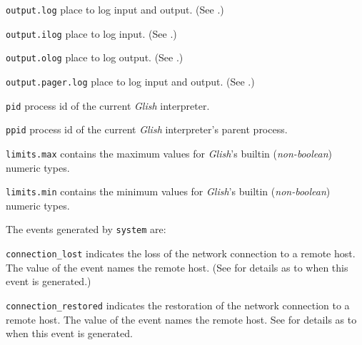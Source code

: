 \begin{sloppy}
\begin{list}{}{}
\begin{list}{}{}
\item[{\tt output.log}] place to log input and output.
(See .)

\item[{\tt output.ilog}] place to log input. (See
.)

\item[{\tt output.olog}] place to log output. (See
.)

\item[{\tt output.pager.log}] place to log input and output.
(See .)

\item[{\tt pid}] process id of the current {\em Glish}
\label{system-pid}
interpreter.

\item[{\tt ppid}] process id of the current {\em Glish}
\label{system-ppid}
interpreter's parent process.

\item[{\tt limits.max}] contains the maximum values for
\label{system-limits-max}
{\em Glish}'s builtin ({\em non-boolean}) numeric types.

\item[{\tt limits.min}] contains the minimum values for
\label{system-limits-min}
{\em Glish}'s builtin ({\em non-boolean}) numeric types.

\end{list}

The events generated by {\tt system} are:
\begin{list}{}{}

\item[{\tt connection\_lost}]
indicates the loss of the network connection to a remote host.  The
value of the event names the remote host.  (See  for
details as to when this event is generated.)

\item[{\tt connection\_restored}]
indicates the restoration of the network connection to a remote host.  The
value of the event names the remote host.  See  for details
as to when this event is generated.


\end{list}
\end{list}
\end{sloppy}
